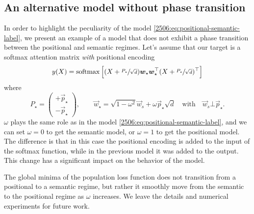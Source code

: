 \subsection{An alternative model without phase transition}
In order to highlight the peculiarity of the model \eqref{2506:eq:positional-semantic-label}, we present an example of a model that does not exhibit a phase transition between the positional and semantic regimes.
Let's assume that our target is a softmax attention matrix \emph{with} positional encoding
\[
y(X) = \operatorname{softmax}\left[(X+\sfrac{P_\star}{\sqrt{d}}){\boldsymbol{w}}_\star {\boldsymbol{w}}_\star^\top (X+\sfrac{P_\star}{\sqrt{d}})^\top\right]
\]
where 
\[
P_\star = \begin{pmatrix} +\vec{p}_\star \\ -\vec{p}_\star \end{pmatrix}, \qquad
\vec{w}_\star = \sqrt{1-\omega^2} \vec{w}_{s} + \omega \vec{p}_\star \sqrt{d}
\quad\text{with}\quad \vec{w}_{s} \bot \vec{p}_\star.
\]
\(\omega\) plays the same role as in the model \eqref{2506:eq:positional-semantic-label}, and we can set \(\omega=0\) to get the semantic model, or \(\omega=1\) to get the positional model. The difference is that in this case the positional encoding is added to the input of the softmax function, while in the previous model it was added to the output. This change has a significant impact on the behavior of the model.

The global minima of the population loss function does not transition from a positional to a semantic regime, but rather it smoothly move from the semantic to the positional regime as \(\omega\) increases. We leave the details and numerical experiments for future work.
